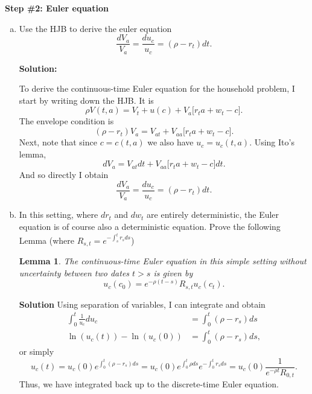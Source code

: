 \documentclass[11pt]{extarticle}
\theoremstyle{plain}
\newtheorem{lem}[thm]{Lemma}
\theoremstyle{definition}
\begin{document}
\vspace{5mm}
\noindent
\textbf{Step \#2: Euler equation}

\begin{enumerate}[(a)]

\item Use the HJB to derive the euler equation
\begin{equation*}
	\frac{dV_a}{V_a} = \frac{du_c}{u_c} =  (\rho - r_t) dt. 
\end{equation*}

\textbf{Solution:}

\vspace{3mm}
\noindent
To derive the continuous-time Euler equation for the household problem, I start by writing down the HJB. It is 
\begin{equation*}
	\rho V(t,a) = V_t + u(c) + V_a \Big[ r_t a + w_t - c \Big]. 
\end{equation*}
The envelope condition is 
\begin{equation*}
	(\rho - r_t) V_a = V_{at} +  V_{aa} \Big[ r_t a + w_t - c \Big] .
\end{equation*}
Next, note that since $c = c(t,a)$ we also have $u_c = u_c(t,a)$. Using Ito's lemma, 
\begin{equation*}
	dV_a = V_{at} dt + V_{aa} \Big[ r_t a + w_t - c \Big] dt. 
\end{equation*}
And so directly I obtain 
\begin{equation*}
	\frac{dV_a}{V_a} = \frac{du_c}{u_c} =  (\rho - r_t) dt. 
\end{equation*}

\item In this setting, where $dr_t$ and $dw_t$ are entirely deterministic, the Euler equation is of course also a deterministic equation. Prove the following Lemma (where $R_{s,t}=e^{-\int_s^t r_s ds}$)
\begin{lem} 
	
	The continuous-time Euler equation in this simple setting without uncertainty between two dates $t > s$ is given by
	\begin{equation*}
		u_c(c_0) = e^{- \rho (t-s)} R_{s,t} u_c(c_t). 
	\end{equation*}
\end{lem}


\textbf{Solution}
Using separation of variables, I can integrate and obtain 
\begin{align*}
	\int_0^t \frac{1}{u_c} du_c &=  \int_0^t (\rho - r_s) ds \\
	\ln(u_c(t)) - \ln(u_c(0)) &=  \int_0^t (\rho - r_s) ds,
\end{align*}
or simply 
\begin{equation*}
	u_c(t) = u_c(0) e^{\int_0^t (\rho - r_s) ds} = u_c(0) e^{\int_0^t \rho ds} e^{- \int_0^t r_s ds} = u_c(0) \frac{1 }{e^{-\rho t}R_{0,t}}.
\end{equation*}
Thus, we have integrated back up to the discrete-time Euler equation. 


\end{enumerate}
\end{document}
